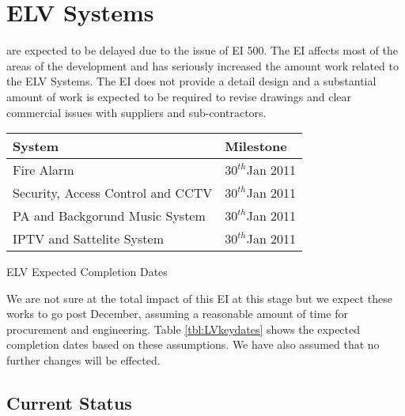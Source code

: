 \newcommand{\elvon}{$30^{th}$\/Jan 2011}
\chapter{ELV Systems}

 are expected to be delayed due to the issue of  EI 500. The EI affects most of the areas of the development and has seriously increased the amount work related to the ELV Systems. The EI does not provide a detail design and a substantial amount of work is expected to be required to revise drawings and clear commercial issues with  suppliers and sub-contractors. 
\begin{margintable}
	    \begin{tabular}{p{2.5cm}l}
	      \toprule
	      System    & Milestone \\
	      \midrule
                 Fire Alarm     &  \elvon  \\   
                 Security, Access Control and CCTV  & \elvon\\
	     PA and Backgorund Music System     &  \elvon  \\
                IPTV and Sattelite System &\elvon\\
     	      \bottomrule
	    \end{tabular}
           \caption{ELV Expected Completion Dates}
           \label{tbl:LVkeydates}
  \end{margintable}


We are not sure at the total impact of this EI at this stage but we expect these works to go post December, assuming a reasonable amount of time for procurement and engineering. Table \ref{tbl:LVkeydates} shows the expected completion dates based on these assumptions. We have also assumed that no further changes will be effected.  

 
 

\section{Current Status}

